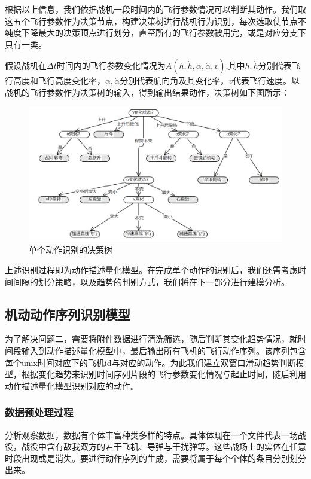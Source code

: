 \documentclass{my_paper}
\begin{document}
根据以上信息，我们依据战机一段时间内的飞行参数情况可以判断其动作。我们取这五个飞行参数作为决策节点，构建决策树进行战机行为识别，每次选取使节点不纯度下降最大的决策顶点进行划分，直至所有的飞行参数被用完，或是对应分支下只有一类。

假设战机在$\Delta t$时间内的飞行参数变化情况为$A(h,\dot{h},\alpha,\dot{\alpha},v )$,其中$h,\dot{h}$分别代表飞行高度和飞行高度变化率，$\alpha,\dot{\alpha}$分别代表航向角及其变化率，$v$代表飞行速度。以战机的飞行参数作为决策树的输入，得到输出结果动作，决策树如下图所示：

\begin {figure}[h]
\centering %
\includegraphics[width=\textwidth]{juece.png}
\caption{单个动作识别的决策树} %
\label{five}
\end {figure}

上述识别过程即为动作描述量化模型。在完成单个动作的识别后，我们还需考虑时间间隔的划分策略，以及趋势的判别方式，我们将在下一部分进行建模分析。

\subsection{机动动作序列识别模型}

为了解决问题二，需要将附件数据进行清洗筛选，随后判断其变化趋势情况，就时间段输入到动作描述量化模型中，最后输出所有飞机的飞行动作序列。该序列包含每个unix时间对应下的飞机id与对应的动作。为此我们建立双窗口滑动趋势判断模型，根据变化趋势来识别时间序列片段的飞行参数变化情况与起止时间，随后利用动作描述量化模型识别对应的动作。

\subsubsection{数据预处理过程}

分析观察数据，数据有个体丰富种类多样的特点。具体体现在一个文件代表一场战役，战役中含有敌我双方的若干飞机、导弹与干扰弹等。这些战场上的实体在任意时段出现或是消失。要进行动作序列的生成，需要将属于每个个体的条目分别划分出来。
\end{document}
